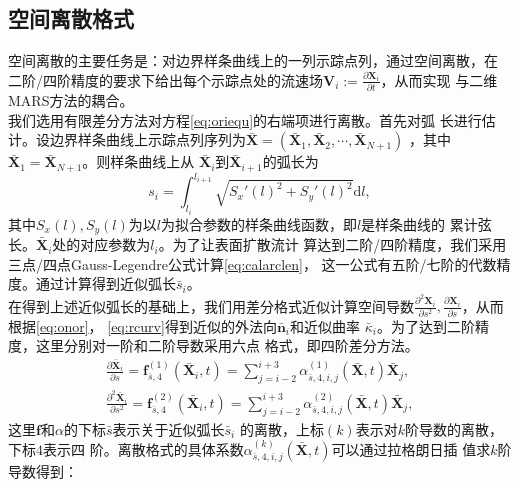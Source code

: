 \documentclass[a4paper,twoside]{ctexart}
\newcommand{\pdfrac}[2]{\frac{\partial #1}{\partial #2}}
\begin{document}
\subsection{空间离散格式}
\label{sec:discrete}
空间离散的主要任务是：对边界样条曲线上的一列示踪点列，通过空间离散，在
二阶/四阶精度的要求下给出每个示踪点处的流速场$\boldsymbol V_i := \pdfrac{\boldsymbol X_i}{t}$，从而实现
与二维MARS方法的耦合。\\
\indent 我们选用有限差分方法对方程\eqref{eq:oriequ}的右端项进行离散。首先对弧
长进行估计。设边界样条曲线上示踪点列序列为$\bar{\boldsymbol X} =
\left(\bar{\boldsymbol X}_1,\bar{\boldsymbol X}_2,\cdots,\bar{\boldsymbol X}_{N+1}\right)$
，其中$\bar{\boldsymbol X}_1 = \bar{\boldsymbol X}_{N+1}$。则样条曲线上从
$\bar{\boldsymbol X}_i$到$\bar{\boldsymbol X}_{i+1}$的弧长为
\begin{equation}
  \label{eq:calarclen}
  s_i = \int_{l_i}^{l_{i+1}}\sqrt{S_x'(l)^2 + S_y'(l)^2}\text{d}l, 
\end{equation}
其中$S_x(l),S_y(l)$为以$l$为拟合参数的样条曲线函数，即$l$是样条曲线的
累计弦长。$\bar{\boldsymbol X}_i$处的对应参数为$l_i$。为了让表面扩散流计
算达到二阶/四阶精度，我们采用三点/四点Gauss-Legendre公式计算\eqref{eq:calarclen}，
这一公式有五阶/七阶的代数精度。通过计算得到近似弧长$\bar{s}_i$。\\
\indent 在得到上述近似弧长的基础上，我们用差分格式近似计算空间导数$\frac{\partial^2\boldsymbol X_i}{\partial
    s^2},\pdfrac{\boldsymbol X_i}{s}$，从而根据\eqref{eq:onor}，
  \eqref{eq:rcurv}得到近似的外法向$\bar{\boldsymbol n}_i$和近似曲率
  $\bar{\kappa}_i$。为了达到二阶精度，这里分别对一阶和二阶导数采用六点
  格式，即四阶差分方法。
  \begin{eqnarray}    
    \pdfrac{\bar{\boldsymbol X}_i}{s} =
    \boldsymbol f_{\bar{s},4}^{(1)}(\bar{\boldsymbol X}_i,t) =
    \sum_{j=i-2}^{i+3}\alpha_{\bar{s},4,i,j}^{(1)}(\bar{\boldsymbol X},t)
    \bar{\boldsymbol X}_j,
    \label{eq:calder1}\\
    \frac{\partial^2\bar{\boldsymbol X}_i}{\partial s^2} =
    \boldsymbol f_{\bar{s},4}^{(2)}(\bar{\boldsymbol X}_i,t) =
    \sum_{j=i-2}^{i+3}\alpha_{\bar{s},4,i,j}^{(2)}(\bar{\boldsymbol X},t)
    \bar{\boldsymbol X}_j,
    \label{eq:calder2}
  \end{eqnarray}
  这里$\boldsymbol f$和$\alpha$的下标$\bar{s}$表示关于近似弧长$\bar{s}_i$
  的离散，上标$(k)$表示对$k$阶导数的离散，下标$4$表示四
  阶。离散格式的具体系数$\alpha_{\bar{s},4,i,j}^{(k)}(\bar{\boldsymbol X},t)$可以通过拉格朗日插
  值求$k$阶导数得到：
\end{document}
